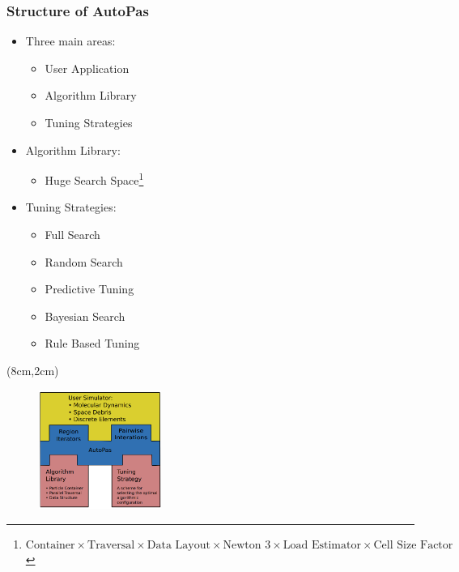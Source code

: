 \documentclass[
	10pt,
	t		%
]{beamer}
\begin{document}
\begin{frame}
    \frametitle{Structure of AutoPas}

    \begin{itemize}
        \item Three main areas:
              \begin{itemize}
                  \item User Application
                  \item Algorithm Library
                  \item Tuning Strategies
              \end{itemize}
        \item Algorithm Library:
              \begin{itemize}
                  \item Huge Search Space\footnote{\scriptsize{$\text{Container}\times\text{Traversal} \times \text{Data Layout} \times \text{Newton 3} \times \text{Load Estimator} \times \text{Cell Size Factor}$}
                        }
              \end{itemize}
        \item Tuning Strategies:
              \begin{itemize}
                  \item Full Search
                  \item Random Search
                  \item Predictive Tuning
                  \item Bayesian Search
                  \item Rule Based Tuning
              \end{itemize}
    \end{itemize}

    \begin{textblock*}{4cm}(8cm,2cm)
        \begin{figure}
            \includegraphics[width=4cm]{figures/AutoPasLibraryStructure.png}
            \caption{ \scriptsize{\cite{Newcome2023Poster}}}

        \end{figure}
    \end{textblock*}
\end{frame}
\end{document}
